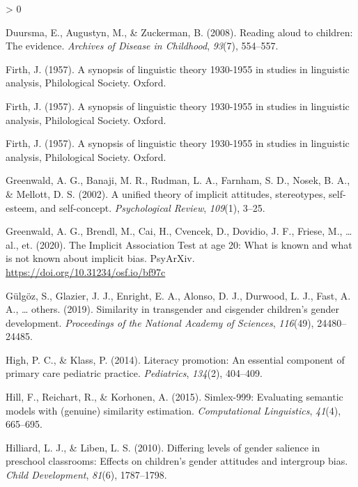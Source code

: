 \documentclass[
  english,
  ,man,floatsintext]{apa6}
\newlength{\cslhangindent}
\newenvironment{CSLReferences}[2] %
 {%
  \setlength{\parindent}{0pt}
  \ifodd #1 \everypar{\setlength{\hangindent}{\cslhangindent}}\ignorespaces\fi
  \ifnum #2 > 0
  \setlength{\parskip}{#2\baselineskip}
  \fi
 }%
 {}
\begin{document}
\begin{CSLReferences}{1}{0}
\leavevmode\hypertarget{ref-duursma2008reading}{}%
Duursma, E., Augustyn, M., \& Zuckerman, B. (2008). Reading aloud to children: The evidence. \emph{Archives of Disease in Childhood}, \emph{93}(7), 554--557.

\leavevmode\hypertarget{ref-firth1957synopsis}{}%
Firth, J. (1957). A synopsis of linguistic theory 1930-1955 in studies in linguistic analysis, {P}hilological {S}ociety. Oxford.

\leavevmode\hypertarget{ref-firth1957synopsis}{}%
Firth, J. (1957). A synopsis of linguistic theory 1930-1955 in studies in linguistic analysis, {P}hilological {S}ociety. Oxford.

\leavevmode\hypertarget{ref-firth1957synopsis}{}%
Firth, J. (1957). A synopsis of linguistic theory 1930-1955 in studies in linguistic analysis, {P}hilological {S}ociety. Oxford.

\leavevmode\hypertarget{ref-greenwald2002unified}{}%
Greenwald, A. G., Banaji, M. R., Rudman, L. A., Farnham, S. D., Nosek, B. A., \& Mellott, D. S. (2002). A unified theory of implicit attitudes, stereotypes, self-esteem, and self-concept. \emph{Psychological Review}, \emph{109}(1), 3--25.

\leavevmode\hypertarget{ref-greenwald2020}{}%
Greenwald, A. G., Brendl, M., Cai, H., Cvencek, D., Dovidio, J. F., Friese, M., \ldots{} al., et. (2020). The {Implicit Association Test} at age 20: What is known and what is not known about implicit bias. PsyArXiv. \url{https://doi.org/10.31234/osf.io/bf97c}

\leavevmode\hypertarget{ref-gulgoz2019similarity}{}%
Gülgöz, S., Glazier, J. J., Enright, E. A., Alonso, D. J., Durwood, L. J., Fast, A. A., \ldots{} others. (2019). Similarity in transgender and cisgender children's gender development. \emph{Proceedings of the National Academy of Sciences}, \emph{116}(49), 24480--24485.

\leavevmode\hypertarget{ref-high2014literacy}{}%
High, P. C., \& Klass, P. (2014). Literacy promotion: An essential component of primary care pediatric practice. \emph{Pediatrics}, \emph{134}(2), 404--409.

\leavevmode\hypertarget{ref-hill2015simlex}{}%
Hill, F., Reichart, R., \& Korhonen, A. (2015). Simlex-999: Evaluating semantic models with (genuine) similarity estimation. \emph{Computational Linguistics}, \emph{41}(4), 665--695.

\leavevmode\hypertarget{ref-hilliard2010differing}{}%
Hilliard, L. J., \& Liben, L. S. (2010). Differing levels of gender salience in preschool classrooms: Effects on children's gender attitudes and intergroup bias. \emph{Child Development}, \emph{81}(6), 1787--1798.


\end{CSLReferences}
\end{document}
